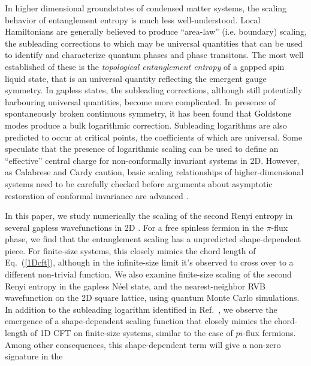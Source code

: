 \documentclass[prl,aps,twocolumn,floatfix,amsmath,amssymb,superscriptaddress,tightenlines]{revtex4}
\begin{document}
In higher dimensional groundstates of condensed matter systems, the scaling behavior of
entanglement entropy is much less well-understood.  Local Hamiltonians
are generally believed to produce ``area-law'' (i.e. boundary) scaling, the subleading corrections
to which may be universal quantities that can be used to identify and characterize
quantum phases and phase transitons.
The most well established of these is the {\it topological entanglement entropy} of a gapped
spin liquid state, that is an universal quantity reflecting the emergent gauge symmetry.
In gapless states, the subleading corrections, although still potentially harbouring universal 
quantities, become more complicated.
In presence of spontaneously broken continuous symmetry, it has been found that Goldstone modes 
produce a bulk logarithmic correction.
Subleading logarithms are also predicted to occur at critical points, the coefficients of which are universal. 
Some speculate that the presence of logarithmic scaling can be used to define an ``effective'' central
charge for non-conformally invariant systems in 2D. %
However, as Calabrese and Cardy caution, basic scaling relationships of
higher-dimensional systems need to be carefully checked before
arguments about asymptotic restoration of conformal invariance are
advanced \cite{EE_CFT}.

In this paper, we study numerically the scaling of the second Renyi entropy in several gapless wavefunctions in 2D \cite{Misguich}.
For a free spinless fermion in the $\pi$-flux phase, we find that the entanglement scaling has a unpredicted shape-dependent piece.
For finite-size systems, this closely mimics the chord length of Eq.~(\ref{1Dcft}), although in the infinite-size limit 
it's observed to cross over to a different non-trivial function.
We also examine finite-size scaling of the second Renyi entropy in the gapless N\'eel state, and the nearest-neighbor RVB wavefunction
on the 2D square lattice, using quantum Monte Carlo simulations.
In addition to the subleading logarithm identified in Ref.~\cite{HeisLog},
we observe the emergence of a shape-dependent scaling function that closely mimics the chord-length of 1D CFT on finite-size systems, similar to the case of $pi$-flux fermions.
Among other consequences, this shape-dependent term will give a non-zero signature in the 
\end{document}
